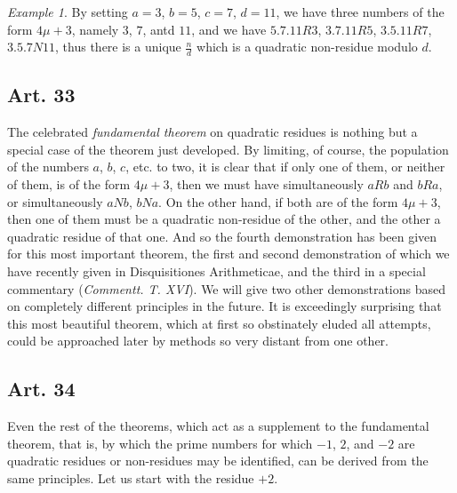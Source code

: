 \documentclass{book}
\theoremstyle{plain}
\theoremstyle{remark}
\newtheorem*{example}{Example}
\begin{document}
\begin{example} By setting $a=3$, $b=5$, $c=7$, $d=11$, we have three numbers of the form $4\mu+3$, namely $3$, $7$, antd $11$, and we have $5.7.11R3$, $3.7.11R5$, $3.5.11R7$, $3.5.7N11$, thus there is a unique $\frac{n}{d}$ which is a quadratic non-residue modulo $d$.\end{example}

\subsection*{Art. 33}

The celebrated \emph{fundamental theorem} on quadratic residues is nothing but a special case of the theorem just developed.  By limiting, of course, the population of the numbers $a$, $b$, $c$, etc. to two, it is clear that if only one of them, or neither of them, is of the form $4\mu+3$, then we must have simultaneously $aRb$ and $bRa$, or simultaneously $aNb$, $bNa$.   On the other hand, if both are of the form $4\mu+3$, then one of them must be a quadratic non-residue of the other, and the other a quadratic residue of that one.  And so the fourth demonstration has been given for this most important theorem, the first and second demonstration of which we have recently given in Disquisitiones Arithmeticae, and the third in a special commentary (\textit{Commentt. T. XVI}).  We will give two other demonstrations based on completely different principles in the future.  It is exceedingly surprising that this most beautiful theorem, which at first so obstinately eluded all attempts, could be approached later by methods so very distant from one other.

\subsection*{Art. 34}

Even the rest of the theorems, which act as a supplement to the fundamental theorem, that is, by which the prime numbers for which $-1$, $2$, and $-2$ are quadratic residues or non-residues may be identified, can be derived from the same principles.  Let us start with the residue $+2$. 
\end{document}
